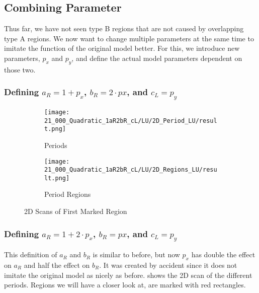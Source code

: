 \subsection{Combining Parameter}

Thus far, we have not seen type B regions that are not caused by overlapping type A regions.
We now want to change multiple parameters at the same time to imitate the function of the original model better.
For this, we introduce new parameters, $p_x$ and $p_y$, and define the actual model parameters dependent on those two.

\subsubsection{Defining $a_R = 1 + p_x$, $b_R = 2 \cdot px$, and $c_L = p_y$}


\begin{figure}
	\centering
	\begin{subfigure}{0.4\textwidth}
		\centering
		\texttt{[image: 21\_000\_Quadratic\_1aR2bR\_cL/LU/2D\_Period\_LU/result.png]}
		\caption{Periods}
		\label{fig:quadratic.full.1aR2bR_cL.2d.1}
	\end{subfigure}
	\begin{subfigure}{0.4\textwidth}
		\centering
		\texttt{[image: 21\_000\_Quadratic\_1aR2bR\_cL/LU/2D\_Regions\_LU/result.png]}
		\caption{Period Regions}
		\label{fig:quadratic.regions.1aR2bR_cL.2d.1}
	\end{subfigure}
	\caption{2D Scans of First Marked Region}
\end{figure}




\subsubsection{Defining $a_R = 1 + 2 \cdot p_x$, $b_R = px$, and $c_L = p_y$}

This definition of $a_R$ and $b_R$ is similar to before, but now $p_x$ has double the effect on $a_R$ and half the effect on $b_R$.
It was created by accident since it does not imitate the original model as nicely as before.
 shows the 2D scan of the different periods.
Regions we will have a closer look at, are marked with red rectangles.

